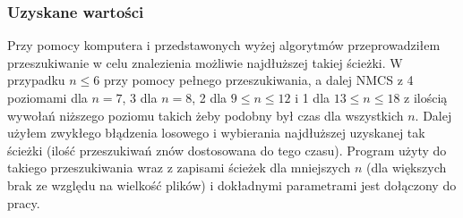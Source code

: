 \documentclass{pracamgr}
\begin{document}
    \subsubsection{Uzyskane wartości}
     Przy pomocy komputera i przedstawonych wyżej algorytmów przeprowadziłem przeszukiwanie w celu znalezienia możliwie najdłuższej takiej ścieżki.
     W przypadku $n\le6$ przy pomocy pełnego przeszukiwania, a dalej NMCS z 4 poziomami dla $n=7$, 3 dla $n=8$, 2 dla $9\le n\le12$ i 1 dla $13\le n\le18$
     z ilością wywołań niższego poziomu takich żeby podobny był czas dla wszystkich $n$. Dalej użyłem zwykłego błądzenia losowego i wybierania najdłuższej
     uzyskanej tak ścieżki (ilość przeszukiwań znów dostosowana do tego czasu).
     Program użyty do takiego przeszukiwania wraz z zapisami ścieżek dla mniejszych $n$ (dla większych brak ze względu na wielkość plików)
     i dokładnymi parametrami jest dołączony do pracy.\newline
     
\end{document}
